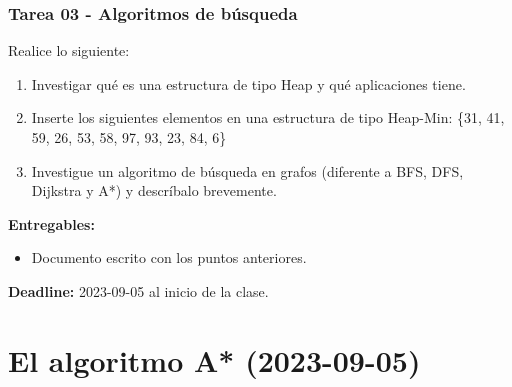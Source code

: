 \begin{frame}[containsverbatim]\frametitle{Tarea 03 - Algoritmos de búsqueda}
  Realice lo siguiente:
  \begin{enumerate}
  \item Investigar qué es una estructura de tipo Heap y qué aplicaciones tiene.
  \item Inserte los siguientes elementos en una estructura de tipo Heap-Min: \{31, 41, 59, 26, 53, 58, 97, 93, 23, 84, 6\}
  \item Investigue un algoritmo de búsqueda en grafos (diferente a BFS, DFS, Dijkstra y A*) y descríbalo brevemente. 
  \end{enumerate}
  \textbf{Entregables:}
  \begin{itemize}
  \item Documento escrito con los puntos anteriores. 
  \end{itemize}
  \textbf{Deadline: } 2023-09-05 al inicio de la clase. 
\end{frame}


\section{El algoritmo A* (2023-09-05)}

